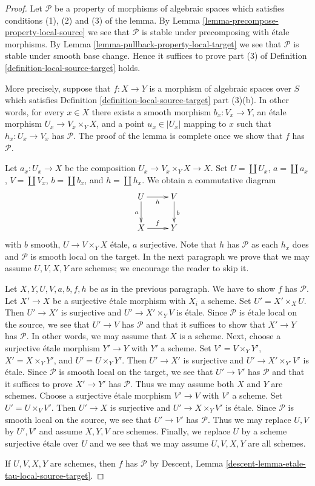 \documentclass[10pt,a4paper]{amsart}
\theoremstyle{plain}
\theoremstyle{definition}
\theoremstyle{remark}
\numberwithin{equation}{subsection}
\begin{document}
\begin{proof}
Let $\mathcal{P}$ be a property of morphisms of algebraic spaces which
satisfies conditions (1), (2) and (3) of the lemma. By
Lemma \ref{lemma-precompose-property-local-source}
we see that $\mathcal{P}$ is stable under precomposing with
\'etale morphisms. By
Lemma \ref{lemma-pullback-property-local-target}
we see that $\mathcal{P}$ is stable under smooth base change.
Hence it suffices to prove part (3) of
Definition \ref{definition-local-source-target}
holds.

\medskip\noindent
More precisely, suppose that $f : X \to Y$ is a morphism
of algebraic spaces over $S$ which satisfies
Definition \ref{definition-local-source-target} part (3)(b).
In other words, for every $x \in X$ there exists
a smooth morphism $b_x : V_x \to Y$,
an \'etale morphism $U_x \to V_x \times_Y X$, and
a point $u_x \in |U_x|$ mapping to $x$
such that $h_x : U_x \to V_x$ has $\mathcal{P}$.
The proof of the lemma is complete once we show that $f$ has $\mathcal{P}$.

\medskip\noindent
Let $a_x : U_x \to X$ be the composition $U_x \to V_x \times_Y X \to X$.
Set $U = \coprod U_x$, $a = \coprod a_x$, $V = \coprod V_x$,
$b = \coprod b_x$, and $h = \coprod h_x$. We obtain a
commutative diagram
$$
\xymatrix{
U \ar[d]_a \ar[r]_h & V \ar[d]^b \\
X \ar[r]^f & Y
}
$$
with $b$ smooth, $U \to V \times_Y X$ \'etale, $a$ surjective.
Note that $h$ has $\mathcal{P}$ as each $h_x$ does and $\mathcal{P}$
is smooth local on the target. In the next paragraph we prove
that we may assume $U, V, X, Y$ are schemes; we encourage the reader
to skip it.

\medskip\noindent
Let $X, Y, U, V, a, b, f, h$ be as in the previous paragraph. We have
to show $f$ has $\mathcal{P}$. Let $X' \to X$ be a surjective \'etale
morphism with $X_i$ a scheme. Set $U' = X' \times_X U$. Then
$U' \to X'$ is surjective and $U' \to X' \times_Y V$ is \'etale.
Since $\mathcal{P}$ is \'etale local on the source, we see that
$U' \to V$ has $\mathcal{P}$ and that it suffices to show that
$X' \to Y$ has $\mathcal{P}$. In other words, we may assume
that $X$ is a scheme. Next, choose a surjective \'etale morphism
$Y' \to Y$ with $Y'$ a scheme. Set $V' = V \times_Y Y'$,
$X' = X \times_Y Y'$, and $U' = U \times_Y Y'$. Then
$U' \to X'$ is surjective and $U' \to X' \times_{Y'} V'$ is \'etale.
Since $\mathcal{P}$ is smooth local on the target, we see that $U' \to V'$ has
$\mathcal{P}$ and that it suffices to prove $X' \to Y'$ has $\mathcal{P}$.
Thus we may assume both $X$ and $Y$ are schemes.
Choose a surjective \'etale morphism $V' \to V$
with $V'$ a scheme. Set $U' = U \times_V V'$.
Then $U' \to X$ is surjective and $U' \to X \times_Y V'$ is \'etale.
Since $\mathcal{P}$ is smooth local on the source, we see that
$U' \to V'$ has $\mathcal{P}$. Thus we may replace $U, V$ by
$U', V'$ and assume $X, Y, V$ are schemes.
Finally, we replace $U$ by a scheme surjective \'etale over $U$
and we see that we may assume $U, V, X, Y$ are all schemes.

\medskip\noindent
If $U, V, X, Y$ are schemes, then $f$ has $\mathcal{P}$
by Descent, Lemma \ref{descent-lemma-etale-tau-local-source-target}.
\end{proof}
\end{document}
